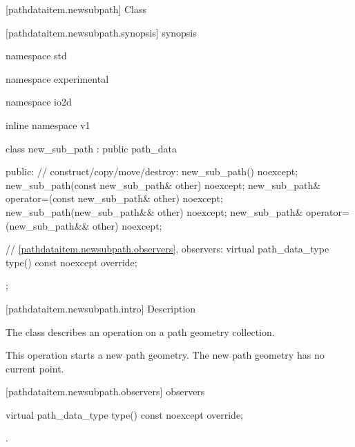  [pathdataitem.newsubpath] {Class }

 [pathdataitem.newsubpath.synopsis] { synopsis}

\begin{codeblock}
namespace std { namespace experimental { namespace io2d { inline namespace v1 {
  class new_sub_path : public path_data {
  public:
    // construct/copy/move/destroy:
    new_sub_path() noexcept;
    new_sub_path(const new_sub_path& other) noexcept;
    new_sub_path& operator=(const new_sub_path& other) noexcept;
    new_sub_path(new_sub_path&& other) noexcept;
    new_sub_path& operator=(new_sub_path&& other) noexcept;

    // \ref{pathdataitem.newsubpath.observers}, observers:
    virtual path_data_type type() const noexcept override;
  };
} } } }
\end{codeblock}

 [pathdataitem.newsubpath.intro] { Description}

\pnum
{}
The class  describes an operation on a path geometry collection.

\pnum
This operation starts a new path geometry. The new path geometry has no current point.

 [pathdataitem.newsubpath.observers]{ observers}

\begin{itemdecl}
    virtual path_data_type type() const noexcept override;
\end{itemdecl}
\begin{itemdescr}
	\pnum
	\returns
	.

\end{itemdescr}
